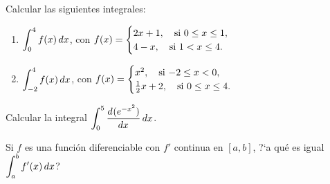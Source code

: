 \item Calcular las siguientes integrales:
  \begin{enumerate}
    \item $\D \int_0^4 f(x)\dx$, con 
    $\D f(x)=\begin{cases}
      2x+1, \quad \text{si $0\le x \le 1$},
      \\
      4-x, \quad \text{si $1<x\le 4$}.
    \end{cases}
      $
      \item $\D \int_{-2}^4 f(x)\dx$, con 
          $\D f(x)=\begin{cases}
        x^2, \quad \text{si $-2\le x < 0$},
        \\
        \frac12 x+2, \quad \text{si $0\le x\le 4$}.
          \end{cases}
        $
  \end{enumerate}

\item Calcular la integral $\D\int_0^{5} \dd[]{(e^{-x^2})}{x}\dx$.

\item Si $f$ es una función diferenciable con $f'$ continua en $[a,b]$, ?`a qué es igual $\D\int_a^b f'(x) \dx$?
